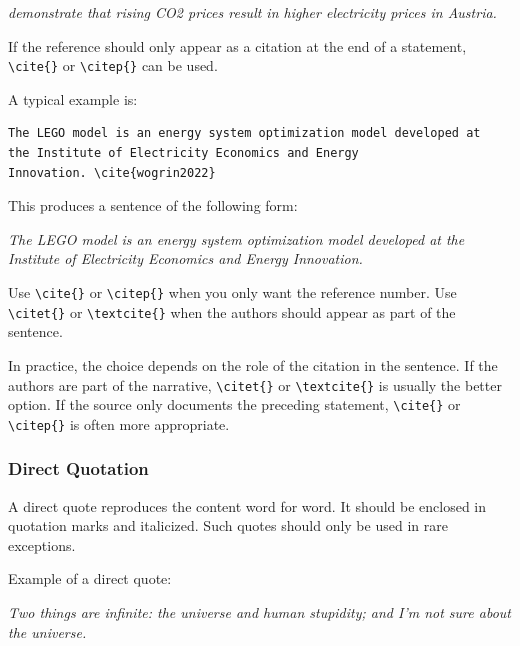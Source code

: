 \documentclass[a4paper, fleqn, headsepline, footsepline, 12pt, parskip=half]{scrartcl}
\begin{document}
\textit{\citet{gaugl2023} demonstrate that rising CO2 prices result in higher electricity prices in Austria.}

If the reference should only appear as a citation at the end of a statement, \texttt{\textbackslash cite\{\}} or \texttt{\textbackslash citep\{\}} can be used.


A typical example is:
\begin{tcolorbox}[colback=black!5, colframe=black!35, boxrule=0.5pt, sharp corners]
\begin{verbatim}
The LEGO model is an energy system optimization model developed at 
the Institute of Electricity Economics and Energy 
Innovation. \cite{wogrin2022}
\end{verbatim}
\end{tcolorbox}

This produces a sentence of the following form:

\textit{The LEGO model is an energy system optimization model developed at the Institute of Electricity Economics and Energy Innovation. \cite{wogrin2022}}

Use \texttt{\textbackslash cite\{\}} or \texttt{\textbackslash citep\{\}} when you only want the reference number. Use \texttt{\textbackslash citet\{\}} or \texttt{\textbackslash textcite\{\}} when the authors should appear as part of the sentence.

In practice, the choice depends on the role of the citation in the sentence. If the authors are part of the narrative, \texttt{\textbackslash citet\{\}} or \texttt{\textbackslash textcite\{\}} is usually the better option. If the source only documents the preceding statement, \texttt{\textbackslash cite\{\}} or \texttt{\textbackslash citep\{\}} is often more appropriate.


\subsubsection{Direct Quotation}
\label{sec:directQuotation}

A direct quote reproduces the content word for word. It should be enclosed in quotation marks and italicized. Such quotes should only be used in rare exceptions.

Example of a direct quote:

\begin{center}
		{\glqq}\textit{Two things are infinite: the universe and human stupidity; and I'm not sure about the universe.}{\grqq} \\
        \citet{Einstein1941}
\end{center}
\end{document}
